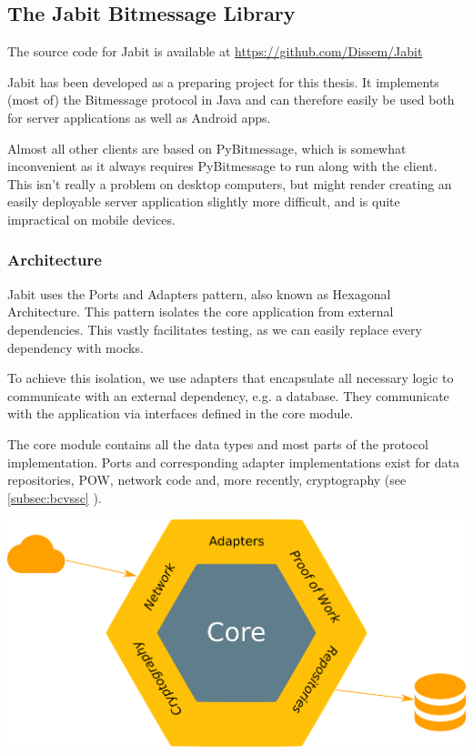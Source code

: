\documentclass{bfh}
\begin{document}
  \subsection{The Jabit Bitmessage Library}
  The source code for Jabit is available at \url{https://github.com/Dissem/Jabit}

  Jabit has been developed as a preparing project for this thesis. It implements (most of) the Bitmessage protocol in Java and can therefore easily be used both for server applications as well as Android apps.

  Almost all other clients are based on PyBitmessage, which is somewhat inconvenient as it always requires PyBitmessage to run along with the client. This isn't really a problem on desktop computers, but might render creating  an easily deployable server application slightly more difficult, and is quite impractical on mobile devices.


  \subsubsection{Architecture}
  Jabit uses the Ports and Adapters pattern, also known as Hexagonal Architecture. This pattern isolates the core application from external dependencies. This vastly facilitates testing, as we can easily replace every dependency with mocks.

  To achieve this isolation, we use adapters that encapsulate all necessary logic to communicate with an external dependency, e.g. a database. They communicate with the application via interfaces defined in the core module.

  The core module contains all the data types and most parts of the protocol implementation. Ports and corresponding adapter implementations exist for data repositories, \ac{POW}, network code and, more recently, cryptography (see \ref{subsec:bcvssc} ).

  \begin{center}
    \includegraphics[width=0.6 \textwidth]{images/ports_and_adapters.pdf}
  \end{center}
\end{document}
